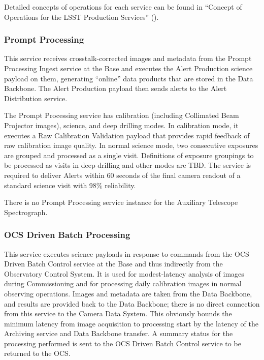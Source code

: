 \documentclass[DM,lsstdraft,toc]{lsstdoc}
\begin{document}
Detailed concepts of operations for each service can be found in
``Concept of Operations for the LSST Production Services'' ().

\subsubsection{Prompt Processing}\label{prompt-processing}

This service receives crosstalk-corrected images and metadata from the
Prompt Processing Ingest service at the Base and executes the Alert
Production science payload on them, generating ``online'' data products
that are stored in the Data Backbone. The Alert Production payload then
sends alerts to the Alert Distribution service.

The Prompt Processing service has calibration (including Collimated Beam
Projector images), science, and deep drilling modes. In calibration
mode, it executes a Raw Calibration Validation payload that provides
rapid feedback of raw calibration image quality. In normal science mode,
two consecutive exposures are grouped and processed as a single visit.
Definitions of exposure groupings to be processed as visits in deep
drilling and other modes are TBD. The service is required to deliver
Alerts within 60 seconds of the final camera readout of a standard
science visit with 98\% reliability.

There is no Prompt Processing service instance for the Auxiliary
Telescope Spectrograph.

\subsubsection{OCS Driven Batch
Processing}\label{ocs-driven-batch-processing}

This service executes science payloads in response to commands from the
OCS Driven Batch Control service at the Base and thus indirectly from
the Observatory Control System. It is used for modest-latency analysis
of images during Commissioning and for processing daily calibration
images in normal observing operations. Images and metadata are taken
from the Data Backbone, and results are provided back to the Data
Backbone; there is no direct connection from this service to the Camera
Data System. This obviously bounds the minimum latency from image
acquisition to processing start by the latency of the Archiving service
and Data Backbone transfer. A summary status for the processing
performed is sent to the OCS Driven Batch Control service to be returned
to the OCS.
\end{document}
